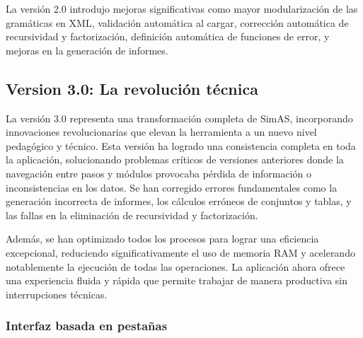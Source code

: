 La versión 2.0 introdujo mejoras significativas como mayor modularización de las gramáticas en XML, validación automática al cargar, corrección automática de recursividad y factorización, definición automática de funciones de error, y mejoras en la generación de informes.

\subsection{Version 3.0: La revolución técnica}

La versión 3.0 representa una transformación completa de SimAS, incorporando innovaciones revolucionarias que elevan la herramienta a un nuevo nivel pedagógico y técnico. Esta versión ha logrado una consistencia completa en toda la aplicación, solucionando problemas críticos de versiones anteriores donde la navegación entre pasos y módulos provocaba pérdida de información o inconsistencias en los datos. Se han corregido errores fundamentales como la generación incorrecta de informes, los cálculos erróneos de conjuntos y tablas, y las fallas en la eliminación de recursividad y factorización.

Además, se han optimizado todos los procesos para lograr una eficiencia excepcional, reduciendo significativamente el uso de memoria RAM y acelerando notablemente la ejecución de todas las operaciones. La aplicación ahora ofrece una experiencia fluida y rápida que permite trabajar de manera productiva sin interrupciones técnicas.

\subsubsection{Interfaz basada en pestañas}

